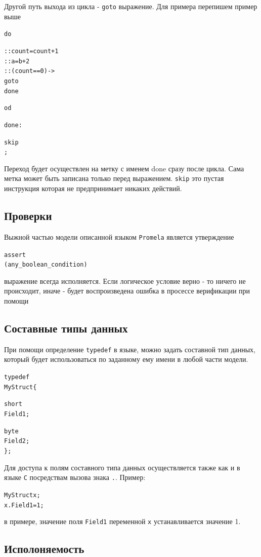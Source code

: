 \documentclass[12pt, twoside]{report}
\newcommand{\cname}[1] {
\textcolor{atnotation}{#1}
}
\begin{document}
Другой путь выхода из цикла - \texttt{goto} выражение. Для примера перепишем пример выше
\begin{alltt}
\cname{do}
  :: count = count + 1
  :: a = b + 2
  :: (count == 0) -> \cname{goto} done
\cname{od}
done:
  \cname{skip};
\end{alltt}
Переход будет осуществлен на метку с именем done сразу после цикла. Сама метка
может быть записана только перед выражением. \texttt{skip} это пустая инструкция которая
не предпринимает никаких действий.


\subsection*{Проверки}\label{promela_language_ASSERT}

Выжной частью модели описанной языком \texttt{Promela} является утверждение
\begin{alltt}
\cname{assert}(any_boolean_condition)
\end{alltt}
выражение всегда исполняется. Если логическое условие верно - то ничего не
происходит, иначе - будет воспроизведена ошибка в просессе верификации
 при помощи 

\subsection*{Составные типы данных}\label{promela_language_STRUCT}

При помощи определение \texttt{typedef} в языке, можно задать составной тип данных,
который будет использоваться по заданному ему имени в любой части модели.
\begin{alltt}
\cname{typedef} MyStruct \{
    \cname{short} Field1;
    \cname{byte}  Field2;
\};
\end{alltt}
Для доступа к полям составного типа данных осуществляется также как и в языке
\texttt{C} посредствам вызова знака \texttt{.}. Пример:
\begin{alltt}
MyStruct x;
x.Field1 = 1;
\end{alltt}
в примере, значение поля \texttt{Field1} переменной \texttt{x} устанавливается
значение 1.

\subsection*{Исполоняемость}\label{promela_language_EXECUTABILITY}
\end{document}
